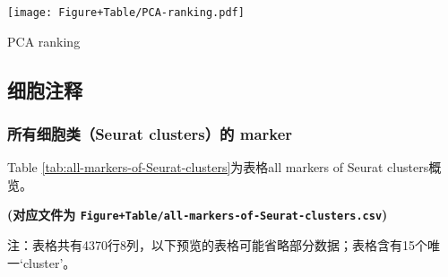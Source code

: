 \documentclass[
]{article}
\begin{document}
\def\@captype{figure}
\begin{center}
\texttt{[image: Figure+Table/PCA-ranking.pdf]}
\caption{PCA ranking}\label{fig:PCA-ranking}
\end{center}

\hypertarget{ux7ec6ux80deux6ce8ux91ca}{%
\subsection{细胞注释}\label{ux7ec6ux80deux6ce8ux91ca}}

\hypertarget{ux6240ux6709ux7ec6ux80deux7c7bseurat-clustersux7684-marker}{%
\subsubsection{所有细胞类（Seurat clusters）的 marker}\label{ux6240ux6709ux7ec6ux80deux7c7bseurat-clustersux7684-marker}}

Table \ref{tab:all-markers-of-Seurat-clusters}为表格all markers of Seurat clusters概览。

\textbf{(对应文件为 \texttt{Figure+Table/all-markers-of-Seurat-clusters.csv})}

\begin{center}\begin{tcolorbox}[colback=gray!10, colframe=gray!50, width=0.9\linewidth, arc=1mm, boxrule=0.5pt]注：表格共有4370行8列，以下预览的表格可能省略部分数据；表格含有15个唯一`cluster'。
\end{tcolorbox}
\end{center}
\end{document}
